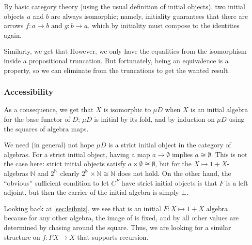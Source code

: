 By basic category theory (using the usual definition of initial objects), two initial objects $a$ and $b$ are always isomorphic;
namely, initiality guarantees that there are arrows $f : a \to b$ and $g : b \to a$, which by initiality must compose to the identities again.

Similarly, we get that
However, we only have the equalities from the isomorphism inside a propositional truncation. But fortunately, being an equivalence is a property, so we can eliminate from the truncations to get the wanted result.


\subsubsection{Accessibility}
As a consequence, we get that $X$ is isomorphic to $\mu D$ when $X$ is an initial algebra for the base functor of $D$; $\mu D$ is initial by its fold, and by induction on $\mu D$ using the squares of algebra maps. 

\begin{remark}
    We need (in general) not hope $\mu D$ is a strict initial object in the category of algebras. For a strict initial object, having a map $a \to \emptyset$ implies $a \cong \emptyset$. This is not the case here: strict initial objects satisfy $a \times \emptyset \cong \emptyset$, but for the $X \mapsto 1 + X$-algebras $\mathbb{N}$ and $2^\mathbb{N}$ clearly $2^\mathbb{N} \times \mathbb{N} \cong \mathbb{N}$ does not hold. On the other hand, the ``obvious'' sufficient condition to let $C^F$ have strict initial objects is that $F$ is a left adjoint, but then the carrier of the initial algebra is simply $\bot$.
\end{remark}

Looking back at \autoref{sec:leibniz}, we see that  is an initial $F: X \mapsto 1 + X$ algebra because for any other algebra, the image of  is fixed, and by  all other values are determined by chasing around the square. Thus, we are looking for a similar structure on $f : FX \to X$ that supports recursion.

